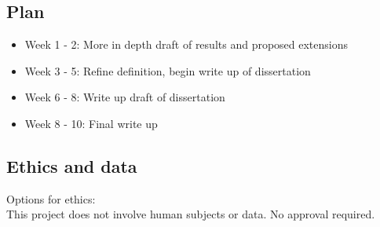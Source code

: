 \documentclass[11pt]{article}
\begin{document}
\subsection{Plan}\label{plan}

\begin{itemize}
    \setlength{\itemsep}{0pt}
    \setlength{\parskip}{0pt}
\item Week 1 - 2: More in depth draft of results and proposed extensions
\item Week 3 - 5: Refine definition, begin write up of dissertation
\item Week 6 - 8: Write up draft of dissertation
\item Week 8 - 10: Final write up
\end{itemize}

    
\subsection{Ethics and data}\label{ethics}

Options for ethics: \\
This project does not involve human subjects or data. No approval required.
\end{document}
